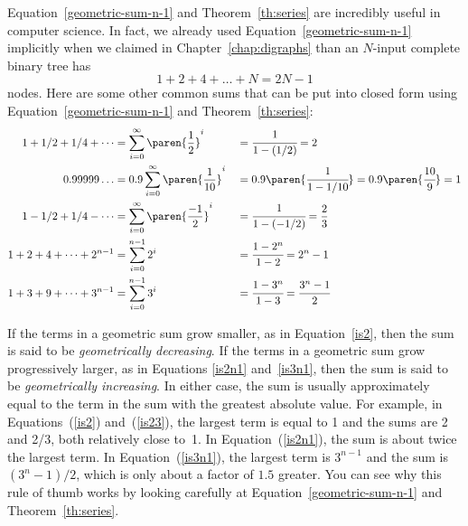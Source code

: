 Equation~\ref{geometric-sum-n-1} and Theorem~\ref{th:series} are
incredibly useful in computer science.  In fact, we already used
Equation~\ref{geometric-sum-n-1} implicitly when we claimed in
Chapter~\ref{chap:digraphs} than an $N$-input complete binary tree
has
\begin{equation*}
    1 + 2 + 4 + \dots + N = 2 N - 1
\end{equation*}
nodes.  Here are some other common sums that can be put into closed
form using Equation~\ref{geometric-sum-n-1} and
Theorem~\ref{th:series}:
\begingroup
{}
\begin{alignat}{3}
1 + 1/2 + 1/4 + \cdots
    & = \sum_{i=0}^\infty \paren{\frac{1}{2}}^i
    &%
    & = \cfrac{1}{1-(1/2)} = 2 \label{is2}
\\
0.99999\dots
    & = 0.9 \sum_{i=0}^{\infty} \paren{\frac{1}{10}}^i
    &
    & = 0.9 \paren{\cfrac{1}{1-1/10}}
      = 0.9 \paren{\cfrac{10}{9}}
      = 1 \label{is1}
\\
1 - 1/2 + 1/4 - \cdots
    & = \sum_{i=0}^\infty \paren{\frac{-1}{2}}^i
    &
    & = \cfrac{1}{1-(-1/2)}
      = \frac{2}{3} \label{is23}
\\
1 + 2 + 4 + \cdots + 2^{n-1}
    & = \sum_{i=0}^{n-1} 2^i
    &
    & = \cfrac{1 - 2^n}{1 - 2}
      = 2^n - 1 \label{is2n1}
\\
1 + 3 + 9 + \cdots + 3^{n-1}
    & = \sum_{i=0}^{n-1} 3^i
    &
    & = \cfrac{1 - 3^n}{1 - 3}
      = \cfrac{3^n - 1}{2} \label{is3n1}
\end{alignat}
\endgroup


If the terms in a geometric sum grow smaller, as in
Equation~\ref{is2}, then the sum is said to be \emph{geometrically
  decreasing}.  If the terms in a geometric sum grow progressively
larger, as in Equations \ref{is2n1} and~\ref{is3n1}, then the sum is
said to be \emph{geometrically increasing}.  In either case, the sum
is usually approximately equal to the term in the sum with the
greatest absolute value.  For example, in Equations~(\ref{is2})
and~(\ref{is23}), the largest term is equal to 1 and the sums are 2
and 2/3, both relatively close to~1.  In Equation~(\ref{is2n1}), the
sum is about twice the largest term.  In Equation~(\ref{is3n1}), the
largest term is $3^{n-1}$ and the sum is $(3^n-1)/2$, which is only
about a factor of $1.5$ greater.  You can see why this rule of thumb
works by looking carefully at Equation~\ref{geometric-sum-n-1} and
Theorem~\ref{th:series}.

